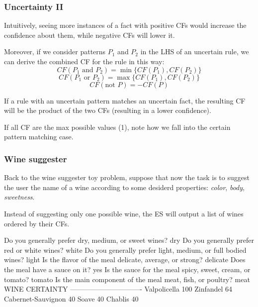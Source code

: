 \documentclass[xcolor={usenames,dvipsnames,svgnames}, compress]{beamer}
\begin{document}
\begin{frame}
  \frametitle{Uncertainty II}
  Intuitively, seeing more instances of a fact with positive CFs would
  increase the confidence about them, while negative CFs will lower it.\par\bigskip
  Moreover, if we consider patterns $P_1$ and $P_2$ in the LHS of an uncertain rule,
  we can derive the combined CF for the rule in this way:
  $$CF(P_1 \text{ and } P_2) = \min\{CF(P_1), CF(P_2)\}$$
  $$CF(P_1 \text{ or } P_2) = \max\{CF(P_1), CF(P_2)\}$$
  $$CF(\text{not } P) = - CF(P)$$\par
  
  If a rule with an uncertain pattern matches an uncertain fact, the
  resulting CF will be the product of the two CFs (resulting in a
  lower confidence).\par

  If all CF are the max possible values (1), note how we fall into the
  certain pattern matching case.
\end{frame}

\begin{frame}[fragile]
  \frametitle{Wine suggester}
  Back to the wine suggester toy problem, suppose that now the task is
  to suggest the user the name of a wine according to some desiderd
  properties: \emph{color}, \emph{body}, \emph{sweetness}.

  Instead of suggesting only one possible wine, the ES will output a
  list of wines ordered by their CFs.

  \begin{clips-code}
    Do you generally prefer dry, medium, or sweet wines? dry
    Do you generally prefer red or white wines? white
    Do you generally prefer light, medium, or full bodied wines? light
    Is the flavor of the meal delicate, average, or strong? delicate
    Does the meal have a sauce on it? yes
    Is the sauce for the meal spicy, sweet, cream, or tomato? tomato
    Is the main component of the meal meat, fish, or poultry? meat
    WINE                  CERTAINTY
    -------------------------------
    Valpolicella             100%
    Zinfandel                64%
    Cabernet-Sauvignon       40%
    Soave                    40%
    Chablis                  40%

  \end{clips-code}
\end{frame}
\end{document}
